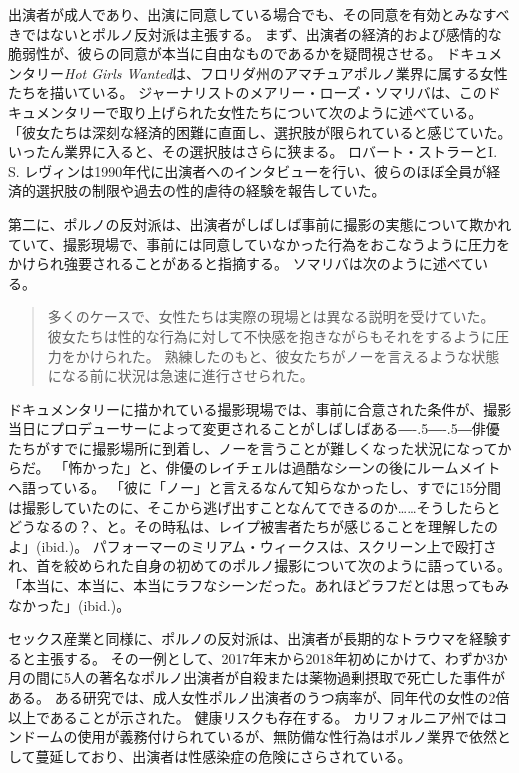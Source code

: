 \documentclass[paper=a4,book,openany]{jlreq}
\newcommand{\ig}[1]{}           %
\def\DDASH{―\kern-.5\zw―\kern-.5\zw―} %
\begin{document}
出演者が成人であり、出演に同意している場合でも、その同意を有効とみなすべきではないとポルノ反対派は主張する。
まず、出演者の経済的および感情的な脆弱性が、彼らの同意が本当に自由なものであるかを疑問視させる。
ドキュメンタリー\emph{Hot Girls Wanted}は、フロリダ州のアマチュアポルノ業界に属する女性たちを描いている。
ジャーナリストのメアリー・ローズ・ソマリバは、このドキュメンタリーで取り上げられた女性たちについて次のように述べている。
「彼女たちは深刻な経済的困難に直面し、選択肢が限られていると感じていた。
いったん業界に入ると、その選択肢はさらに狭まる\citep{somarriba15:_porn_indus_is_abusiv_these}。
ロバート・ストラーとI. S. レヴィンは1990年代に出演者へのインタビューを行い、彼らのほぼ全員が経済的選択肢の制限や過去の性的虐待の経験を報告していた\citep{stoller93:_comin_attrac}。

第二に、ポルノの反対派は、出演者がしばしば事前に撮影の実態について欺かれていて、撮影現場で、事前には同意していなかった行為をおこなうように圧力をかけられ強要されることがあると指摘する。
ソマリバは次のように述べている。

\begin{quote}
多くのケースで、女性たちは実際の現場とは異なる説明を受けていた。
彼女たちは性的な行為に対して不快感を抱きながらもそれをするように圧力をかけられた。
熟練したのもと、彼女たちがノーを言えるような状態になる前に状況は急速に進行させられた。
\citep{somarriba15:_porn_indus_is_abusiv_these}
\end{quote}

ドキュメンタリーに描かれている撮影現場では、事前に合意された条件が、撮影当日にプロデューサーによって変更されることがしばしばある{\DDASH}俳優たちがすでに撮影場所に到着し、ノーを言うことが難しくなった状況になってからだ。
「怖かった」と、俳優のレイチェルは過酷なシーンの後にルームメイトへ語っている。
「彼に「ノー」と言えるなんて知らなかったし、すでに15分間は撮影していたのに、そこから逃げ出すことなんてできるのか……そうしたらとどうなるの？、と。その時私は、レイプ被害者たちが感じることを理解したのよ」(ibid.)。
パフォーマーのミリアム・ウィークスは、スクリーン上で殴打され、首を絞められた自身の初めてのポルノ撮影について次のように語っている。
「本当に、本当に、本当にラフなシーンだった。あれほどラフだとは思ってもみなかった」(ibid.)。

セックス産業と同様に、ポルノの反対派は、出演者が長期的なトラウマを経験すると主張する。
その一例として、2017年末から2018年初めにかけて、わずか3か月の間に5人の著名なポルノ出演者が自殺または薬物過剰摂取で死亡した事件がある。
ある研究では、成人女性ポルノ出演者のうつ病率が、同年代の女性の2倍以上であることが示された\citep{grudzen01:_compar_mental_healt_femal_adult}。
健康リスクも存在する。
カリフォルニア州ではコンドームの使用が義務付けられているが、無防備な性行為はポルノ業界で依然として蔓延しており、出演者は性感染症\ig{(STI)}の危険にさらされている\citep{coyne09:_sexual_healt_adult_workin_pornog_films}。
\end{document}
